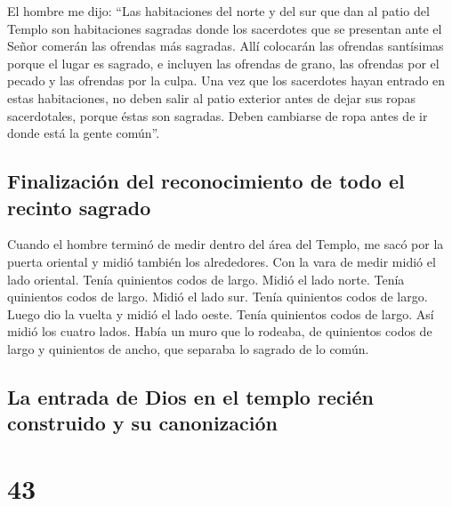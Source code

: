  El hombre me dijo: ``Las habitaciones del norte y del
sur que dan al patio del Templo son habitaciones sagradas donde los
sacerdotes que se presentan ante el Señor comerán las ofrendas más
sagradas. Allí colocarán las ofrendas santísimas porque el lugar es
sagrado, e incluyen las ofrendas de grano, las ofrendas por el pecado y
las ofrendas por la culpa.  Una vez que los sacerdotes
hayan entrado en estas habitaciones, no deben salir al patio exterior
antes de dejar sus ropas sacerdotales, porque éstas son sagradas. Deben
cambiarse de ropa antes de ir donde está la gente común''.

\hypertarget{finalizaciuxf3n-del-reconocimiento-de-todo-el-recinto-sagrado}{%
\subsection{Finalización del reconocimiento de todo el recinto
sagrado}\label{finalizaciuxf3n-del-reconocimiento-de-todo-el-recinto-sagrado}}

 Cuando el hombre terminó de medir dentro del área del
Templo, me sacó por la puerta oriental y midió también los alrededores.
 Con la vara de medir midió el lado oriental. Tenía
quinientos codos de largo.  Midió el lado norte. Tenía
quinientos codos de largo.  Midió el lado sur. Tenía
quinientos codos de largo.  Luego dio la vuelta y midió
el lado oeste. Tenía quinientos codos de largo.  Así
midió los cuatro lados. Había un muro que lo rodeaba, de quinientos
codos de largo y quinientos de ancho, que separaba lo sagrado de lo
común.

\hypertarget{la-entrada-de-dios-en-el-templo-reciuxe9n-construido-y-su-canonizaciuxf3n}{%
\subsection{La entrada de Dios en el templo recién construido y su
canonización}\label{la-entrada-de-dios-en-el-templo-reciuxe9n-construido-y-su-canonizaciuxf3n}}

\hypertarget{section-42}{%
\section{43}\label{section-42}}

